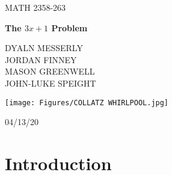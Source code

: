 \documentclass[10pt,english, openany]{book}
\begin{document}

\begin{titlepage}
	\clearpage\thispagestyle{empty}
	\centering
	\vspace{1cm}

	{\normalsize MATH 2358-263 \\  \par}
		\vspace{3cm}
	{\Huge \textbf{\bf{The $3x + 1$ Problem}}}\\
	\vspace{4cm}
	{\normalsize DYALN MESSERLY \\JORDAN FINNEY \\MASON GREENWELL\\JOHN-LUKE SPEIGHT\par}
	\vspace{5cm}
    
    \centering \texttt{[image: Figures/COLLATZ WHIRLPOOL.jpg]}
    
    \vspace{0.5cm}
		
	{\normalsize 04/13/20 \par}
	
	\pagebreak

\end{titlepage}

\tableofcontents{}

\mainmatter

\chapter{Introduction}\label{chapt:sum}
\end{document}

